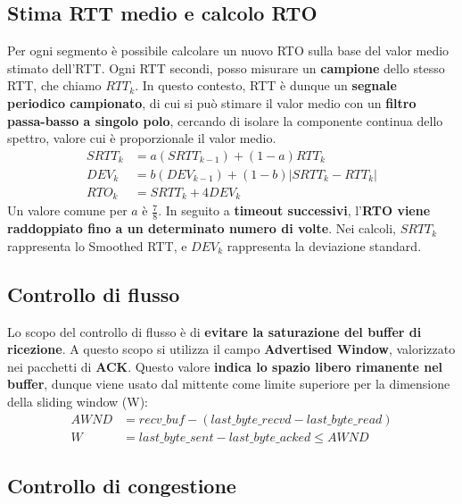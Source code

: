 \documentclass[12pt]{article}
\begin{document}
\subsection{Stima RTT medio e calcolo RTO}

Per ogni segmento è possibile calcolare un nuovo RTO sulla base del valor medio stimato dell'RTT. Ogni RTT secondi, posso misurare un \textbf{campione} dello stesso RTT, che chiamo $RTT_k$. In questo contesto, RTT è dunque un \textbf{segnale periodico campionato}, di cui si può stimare il valor medio con un \textbf{filtro passa-basso a singolo polo}, cercando di isolare la componente continua dello spettro, valore cui è proporzionale il valor medio.
\begin{align*}
SRTT_k &= a(SRTT_{k-1}) + (1-a)RTT_k\\
DEV_k &= b(DEV_{k-1}) + (1-b)|SRTT_k - RTT_k|\\
RTO_k &= SRTT_k + 4DEV_k
\end{align*}
Un valore comune per $a$ è $\frac{7}{8}$. In seguito a \textbf{timeout successivi}, l'\textbf{RTO viene raddoppiato fino a un determinato numero di volte}. Nei calcoli, $SRTT_k$ rappresenta lo Smoothed RTT, e $DEV_k$ rappresenta la deviazione standard.

\subsection{Controllo di flusso}

Lo scopo del controllo di flusso è di \textbf{evitare la saturazione del buffer di ricezione}. A questo scopo si utilizza il campo \textbf{Advertised Window}, valorizzato nei pacchetti di \textbf{ACK}. Questo valore \textbf{indica lo spazio libero rimanente nel buffer}, dunque viene usato dal mittente come limite superiore per la dimensione della sliding window (W):
\begin{align*}
    AWND &= recv\_buf - (last\_byte\_recvd - last\_byte\_read)\\
    W &= last\_byte\_sent - last\_byte\_acked \leq AWND
\end{align*}

\subsection{Controllo di congestione}
\end{document}
